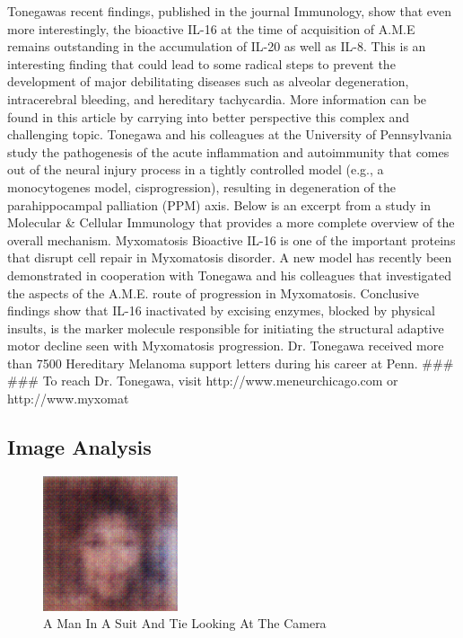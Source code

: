 \documentclass{article}%
\begin{document}
Tonegawas recent findings, published in the journal Immunology, show that even more interestingly, the bioactive IL{-}16 at the time of acquisition of A.M.E remains outstanding in the accumulation of IL{-}20 as well as IL{-}8. This is an interesting finding that could lead to some radical steps to prevent the development of major debilitating diseases such as alveolar degeneration, intracerebral bleeding, and hereditary tachycardia. More information can be found in this article by carrying into better perspective this complex and challenging topic.\newline%
Tonegawa and his colleagues at the University of Pennsylvania study the pathogenesis of the acute inflammation and autoimmunity that comes out of the neural injury process in a tightly controlled model (e.g., a monocytogenes model, cisprogression), resulting in degeneration of the parahippocampal palliation (PPM) axis. Below is an excerpt from a study in Molecular \& Cellular Immunology that provides a more complete overview of the overall mechanism.\newline%
Myxomatosis\newline%
Bioactive IL{-}16 is one of the important proteins that disrupt cell repair in Myxomatosis disorder. A new model has recently been demonstrated in cooperation with Tonegawa and his colleagues that investigated the aspects of the A.M.E. route of progression in Myxomatosis. Conclusive findings show that IL{-}16 inactivated by excising enzymes, blocked by physical insults, is the marker molecule responsible for initiating the structural adaptive motor decline seen with Myxomatosis progression.\newline%
Dr. Tonegawa received more than 7500 Hereditary Melanoma support letters during his career at Penn.\newline%
\#\#\#\newline%
\#\#\#\newline%
To reach Dr. Tonegawa, visit http://www.meneurchicago.com or http://www.myxomat

%
\subsection{Image Analysis}%
\label{subsec:ImageAnalysis}%


\begin{figure}[h!]%
\centering%
\includegraphics[width=150px]{500_fake_images/samples_5_420.png}%
\caption{A Man In A Suit And Tie Looking At The Camera}%
\end{figure}

%
\end{document}

